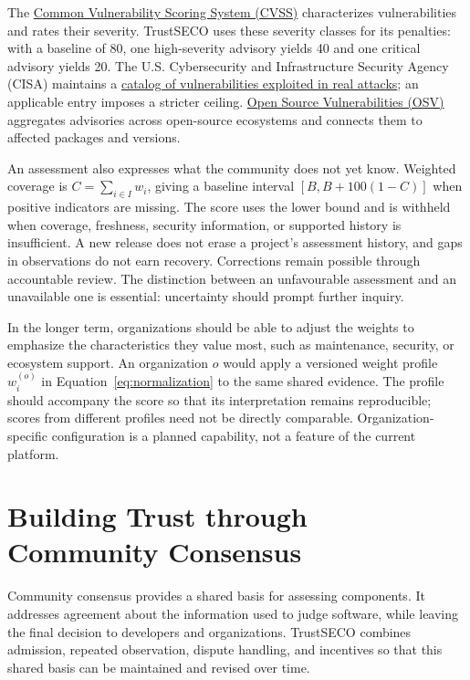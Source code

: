 \documentclass[10pt,conference]{IEEEtran}
\begin{document}
The \href{https://www.first.org/cvss/v4.0/specification-document}{Common Vulnerability Scoring System (CVSS)} characterizes vulnerabilities and rates their severity. TrustSECO uses these severity classes for its penalties: with a baseline of 80, one high-severity advisory yields 40 and one critical advisory yields 20. The U.S. Cybersecurity and Infrastructure Security Agency (CISA) maintains a \href{https://www.cisa.gov/known-exploited-vulnerabilities-catalog}{catalog of vulnerabilities exploited in real attacks}; an applicable entry imposes a stricter ceiling. \href{https://osv.dev/}{Open Source Vulnerabilities (OSV)} aggregates advisories across open-source ecosystems and connects them to affected packages and versions.

An assessment also expresses what the community does not yet know. Weighted coverage is $C=\sum_{i\in I}w_i$, giving a baseline interval $[B,B+100(1-C)]$ when positive indicators are missing. The score uses the lower bound and is withheld when coverage, freshness, security information, or supported history is insufficient. A new release does not erase a project's assessment history, and gaps in observations do not earn recovery. Corrections remain possible through accountable review. The distinction between an unfavourable assessment and an unavailable one is essential: uncertainty should prompt further inquiry.

In the longer term, organizations should be able to adjust the weights to emphasize the characteristics they value most, such as maintenance, security, or ecosystem support. An organization $o$ would apply a versioned weight profile $w_i^{(o)}$ in Equation~\ref{eq:normalization} to the same shared evidence. The profile should accompany the score so that its interpretation remains reproducible; scores from different profiles need not be directly comparable. Organization-specific configuration is a planned capability, not a feature of the current platform.

\section{Building Trust through Community Consensus}
\label{sec:community}
Community consensus provides a shared basis for assessing components. It addresses agreement about the information used to judge software, while leaving the final decision to developers and organizations. TrustSECO combines admission, repeated observation, dispute handling, and incentives so that this shared basis can be maintained and revised over time.
\end{document}
